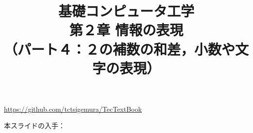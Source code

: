 \documentclass[handout]{beamer}        %
\begin{document}
\title{基礎コンピュータ工学\\第２章 情報の表現\\
       （パート４：２の補数の和差，小数や文字の表現）}
\date{}

\begin{frame}
  \titlepage
  \centerline{\url{https://github.com/tctsigemura/TecTextBook}}
  \vfill
  \centerline{本スライドの入手：
    }
\end{frame}

\end{document}
